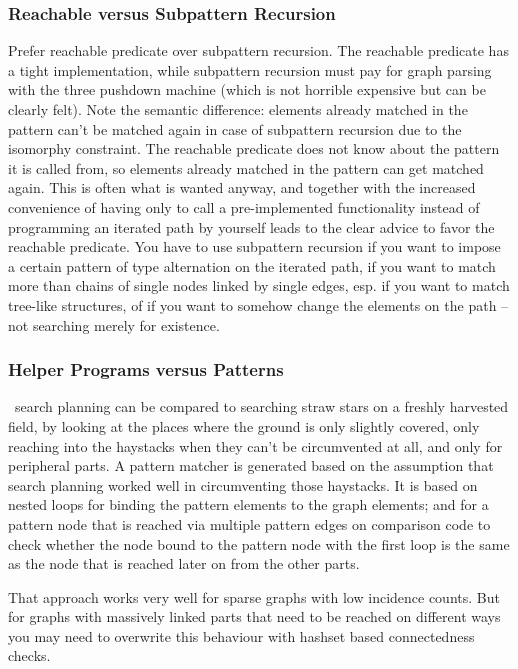 \subsubsection*{Reachable versus Subpattern Recursion}
Prefer reachable predicate over subpattern recursion.
The reachable predicate has a tight implementation, while subpattern recursion must pay for graph parsing with the three pushdown machine (which is not horrible expensive but can be clearly felt).
Note the semantic difference: elements already matched in the pattern can't be matched again in case of subpattern recursion due to the isomorphy constraint. 
The reachable predicate does not know about the pattern it is called from, so elements already matched in the pattern can get matched again.
This is often what is wanted anyway, and together with the increased convenience of having only to call a pre-implemented functionality instead of programming an iterated path by yourself leads to the clear advice to favor the reachable predicate.
You have to use subpattern recursion if you want to impose a certain pattern of type alternation on the iterated path, 
if you want to match more than chains of single nodes linked by single edges, esp. if you want to match tree-like structures,
of if you want to somehow change the elements on the path -- not searching merely for existence.

\subsubsection*{Helper Programs versus Patterns}
\GrG\ search planning can be compared to searching straw stars on a freshly harvested field,
by looking at the places where the ground is only slightly covered, only reaching into the haystacks when
they can't be circumvented at all, and only for peripheral parts.
A pattern matcher is generated based on the assumption that search planning worked well in circumventing those haystacks. 
It is based on nested loops for binding the pattern elements to the graph elements;
and for a pattern node that is reached via multiple pattern edges on
comparison code to check whether the node bound to the pattern node with the first loop
is the same as the node that is reached later on from the other parts. 

That approach works very well for sparse graphs with low incidence counts.
But for graphs with massively linked parts that need to be reached on different ways you may need to overwrite this behaviour with hashset based connectedness checks.

